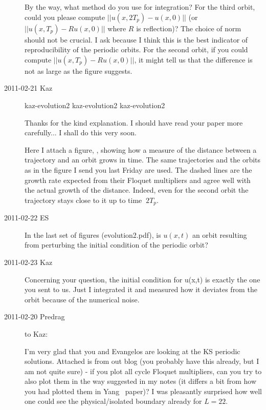 \begin{description}
By the way, what method do you use for integration? For the third
orbit, could you please compute $||u(x,2T_p)-u(x,0)||$ (or
$||u(x,T_p)-Ru(x,0)||$ where $R$ is reflection)? The choice of norm should
not be crucial. I ask because I think this is the best indicator of
reproducibility of the periodic orbits. For the second orbit, if you
could compute $||u(x,T_p)-Ru(x,0)||$, it might tell us that the
difference is not as large as the figure suggests.

\item[2011-02-21 Kaz]

{kaz-evolution2}   %
{}   %
{    %
kaz-evolution2
}
{kaz-evolution2}   %


Thanks for the kind explanation. I should have read your
paper more carefully... I shall do this very soon.

Here I attach a figure, , showing
how a measure of the distance between a
trajectory and an orbit grows in time. The same trajectories and the orbits
as in the figure I send you last Friday are used. The dashed lines are the
growth rate expected from their Floquet multipliers and agree well with the
actual growth of the distance. Indeed, even for the second orbit the trajectory
stays close to it up to time $~2T_p$.

\item[2011-02-22 ES] In the last set of figures (evolution2.pdf), is $u(x,t)$
an orbit resulting from perturbing the initial condition of the periodic orbit?

\item[2011-02-23 Kaz] Concerning your question, the initial condition for u(x,t)
is exactly the one you sent to us. Just I integrated it and measured how
it deviates from the orbit because of the numerical noise.


\item[2011-02-20 Predrag] to Kaz:

I'm very glad that you and Evangelos are looking at the KS periodic solutions.
Attached is  from out blog
(you probably have this already, but
I am not quite sure) - if you plot all cycle Floquet multipliers, can you try to
also plot them in the way suggested in my notes (it differs a bit from how you
had plotted them in Yang \etal\ paper)?
I was pleasantly surprised how well one
could see the physical/isolated boundary already for $L=22$.



\end{description}

